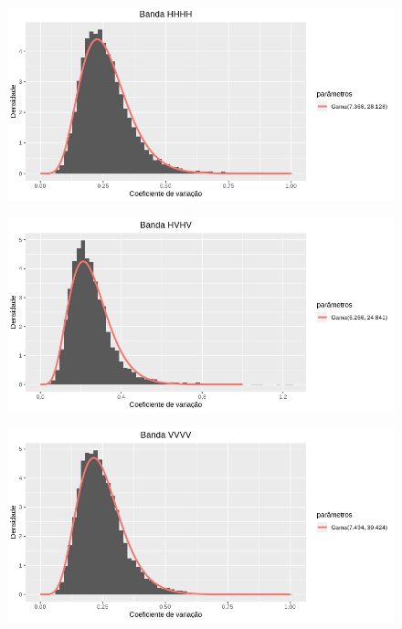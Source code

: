 \documentclass[12pt]{article}
\begin{document}
\begin{figure}[hbt]
    \centering
    \includegraphics[scale = 0.75]{../../Images/Report_18_09_17/density_hhhh.jpeg}
\end{figure}

\begin{figure}[!ht]
    \centering
    \includegraphics[scale = 0.75]{../../Images/Report_18_09_17/density_hvhv.jpeg}
\end{figure}

\begin{figure}[!ht]
    \centering
    \includegraphics[scale = 0.75]{../../Images/Report_18_09_17/density_vvvv.jpeg}
\end{figure}

\end{document}
